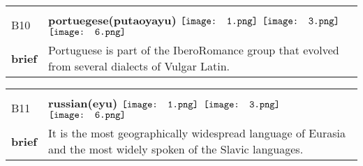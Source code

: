 \documentclass[UTF8]{article}
\begin{document}
            \begin{tabularx}{\textwidth}{p{1.5cm}X}
            \arrayrulecolor{myBlue}
        	\hline\\
            \small{B10}&
            \large{\bfseries{portuegese(putaoyayu)}}\hfill
                                                $\vcenter{\hbox{\texttt{[image: 1.png]}}}$
                                                                \phantom{$\vcenter{\hbox{\texttt{[image: 2.png]}}}$}
                                                                $\vcenter{\hbox{\texttt{[image: 3.png]}}}$
                                                                \phantom{$\vcenter{\hbox{\texttt{[image: 4.png]}}}$}
                                                                \phantom{$\vcenter{\hbox{\texttt{[image: 5.png]}}}$}
                                                                $\vcenter{\hbox{\texttt{[image: 6.png]}}}$
                                                                \phantom{$\vcenter{\hbox{\texttt{[image: 7.png]}}}$}
                                        \\[10pt]
            \large{\bfseries{brief}}&\noindent\parbox[c]{\hsize}{Portuguese is part of the IberoRomance group that evolved from several dialects of Vulgar Latin.} \\[5pt]
            \hline\\[-10pt]
        \end{tabularx}
            \begin{tabularx}{\textwidth}{p{1.5cm}X}
            \arrayrulecolor{myBlue}
        	\hline\\
            \small{B11}&
            \large{\bfseries{russian(eyu)}}\hfill
                                                $\vcenter{\hbox{\texttt{[image: 1.png]}}}$
                                                                \phantom{$\vcenter{\hbox{\texttt{[image: 2.png]}}}$}
                                                                $\vcenter{\hbox{\texttt{[image: 3.png]}}}$
                                                                \phantom{$\vcenter{\hbox{\texttt{[image: 4.png]}}}$}
                                                                \phantom{$\vcenter{\hbox{\texttt{[image: 5.png]}}}$}
                                                                $\vcenter{\hbox{\texttt{[image: 6.png]}}}$
                                                                \phantom{$\vcenter{\hbox{\texttt{[image: 7.png]}}}$}
                                        \\[10pt]
            \large{\bfseries{brief}}&\noindent\parbox[c]{\hsize}{It is the most geographically widespread language of Eurasia and the most widely spoken of the Slavic languages. } \\[5pt]
            \hline\\[-10pt]
        \end{tabularx}
\end{document}
